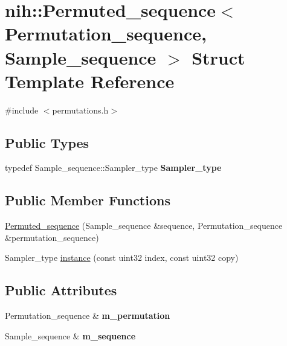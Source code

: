 \hypertarget{structnih_1_1_permuted__sequence}{
\section{nih\-:\-:\-Permuted\-\_\-sequence$<$ \-Permutation\-\_\-sequence, \-Sample\-\_\-sequence $>$ \-Struct \-Template \-Reference}
\label{structnih_1_1_permuted__sequence}
}


{\ttfamily \#include $<$permutations.\-h$>$}

\subsection*{\-Public \-Types}
\begin{DoxyCompactItemize}
\item 
\hypertarget{structnih_1_1_permuted__sequence_af235be53b17aeade026adf21cfd5af12}{
typedef \*
\-Sample\-\_\-sequence\-::\-Sampler\-\_\-type {\bfseries \-Sampler\-\_\-type}}
\label{structnih_1_1_permuted__sequence_af235be53b17aeade026adf21cfd5af12}

\end{DoxyCompactItemize}
\subsection*{\-Public \-Member \-Functions}
\begin{DoxyCompactItemize}
\item 
\hyperlink{structnih_1_1_permuted__sequence_a2bad998da0ba30bd5558bb7c39b48d1e}{\-Permuted\-\_\-sequence} (\-Sample\-\_\-sequence \&sequence, \-Permutation\-\_\-sequence \&permutation\-\_\-sequence)
\item 
\-Sampler\-\_\-type \hyperlink{structnih_1_1_permuted__sequence_adbd66e835486f8cb3908d660e12689c5}{instance} (const uint32 index, const uint32 copy)
\end{DoxyCompactItemize}
\subsection*{\-Public \-Attributes}
\begin{DoxyCompactItemize}
\item 
\hypertarget{structnih_1_1_permuted__sequence_aa230ab1d09793b3ca399910b661f309d}{
\-Permutation\-\_\-sequence \& {\bfseries m\-\_\-permutation}}
\label{structnih_1_1_permuted__sequence_aa230ab1d09793b3ca399910b661f309d}

\item 
\hypertarget{structnih_1_1_permuted__sequence_abe8a82ee142a6843a5b2346340b83ea7}{
\-Sample\-\_\-sequence \& {\bfseries m\-\_\-sequence}}
\label{structnih_1_1_permuted__sequence_abe8a82ee142a6843a5b2346340b83ea7}

\end{DoxyCompactItemize}


